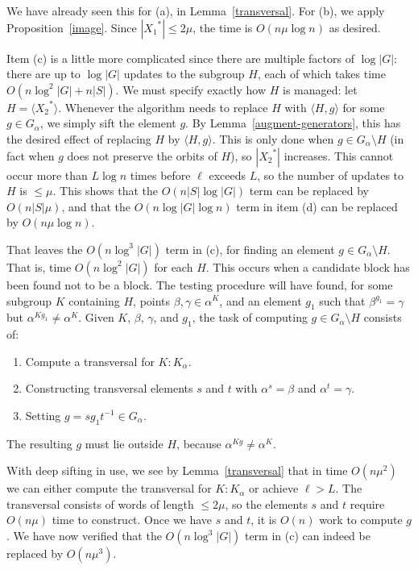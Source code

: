 \documentclass[12pt]{article}
\begin{document}
We have already seen this for (a), in Lemma~\ref{transversal}.
For (b), we apply Proposition~\ref{image}.
Since $|{X_1}^*|\leq 2\mu$,
the time is $O(n\mu\log n)$ as desired.

Item (c) is a little
more complicated since there are multiple factors of $\log|G|$:
there are up to $\log |G|$ updates to the subgroup $H$, each of which
takes time $O(n\log^2|G|+n|S|)$. We must specify exactly
how $H$ is managed: let $H=\langle{X_2}^*\rangle$.
Whenever the algorithm needs to replace $H$ with $\langle H,g\rangle$
for some $g\in G_\alpha$, we simply sift
the element $g$.
By Lemma~\ref{augment-generators}, this has the desired effect
of replacing $H$ by $\langle H,g\rangle$.
This is only done when $g\in G_\alpha\setminus H$ (in fact
when $g$ does not preserve the orbits of $H$), so $|{X_2}^*|$ increases.
This cannot occur more than $L\log n$ times before $\ell$ exceeds $L$,
so the number of updates to $H$ is $\leq \mu$.  This shows
that the $O(n|S|\log|G|)$ term can be replaced by $O(n|S|\mu)$,
and that the  $O(n\log|G|\log n)$ term in item (d) can
be replaced by $O(n\mu\log n)$.

That leaves the $O(n\log^3 |G|)$ term in (c), for
finding an element $g\in G_\alpha\setminus H$.
That is, time $O(n\log^2|G|)$ for each $H$.
This occurs when a candidate block has been found not
to be a block. The testing procedure will have
found, for some subgroup $K$ containing $H$,
points $\beta,\gamma\in {\alpha}^K$,
and an element $g_1$ such that $\beta^{g_1}=\gamma$ but
${\alpha}^{Kg_1}\neq{\alpha}^K$.
Given $K$, $\beta$, $\gamma$, and $g_1$,
the task of computing $g\in G_\alpha\setminus H$ consists of:
\begin{enumerate}
  \item Compute a transversal for  $K:K_\alpha$.
  \item Constructing transversal elements $s$ and $t$
    with ${\alpha}^s=\beta$ and ${\alpha}^t=\gamma$.
  \item Setting $g=sg_1t^{-1}\in G_\alpha$.
\end{enumerate}
The resulting $g$ must lie outside $H$,
because ${\alpha}^{Kg}\neq{\alpha}^K$.

With deep sifting in use,
we see by Lemma~\ref{transversal} that in time $O(n\mu^2)$
we can either compute the transversal for  $K:K_\alpha$ or achieve $\ell>L$.
The transversal consists of words of length $\leq 2\mu$, so
the elements $s$ and $t$ require $O(n\mu)$
time to construct.  Once we have $s$ and $t$,
it is $O(n)$ work to compute $g$.
We have now verified that the $O(n\log^3 |G|)$ term in (c) can indeed be
replaced by $O(n\mu^3)$.
\end{document}
